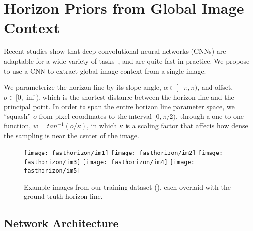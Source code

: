 \section{Horizon Priors from Global Image Context}
\label{sec:deeplearning}

Recent studies show that deep convolutional neural networks (CNNs) are
adaptable for a wide variety of tasks~\cite{yosinski2014transferable},
and are quite fast in practice.  We propose to use a CNN to extract
global image context from a single image.


We parameterize the horizon line by its slope angle, $\alpha \in
[-\pi, \pi)$, and offset, $o \in [0, \inf)$, which is the shortest
distance between the horizon line and the principal point. In order to
span the entire horizon line parameter space, we ``squash'' $o$ from
pixel coordinates to the interval $[0, \pi/2)$, through a one-to-one
function, $w = tan^{-1}(o / \kappa)$, in which $\kappa$ is a
scaling factor that affects how dense the sampling is near the center
of the image.




\begin{figure*}
  \hfill
  \texttt{[image: fasthorizon/im1]}
  \hfill
  \texttt{[image: fasthorizon/im2]}
  \hfill
  \texttt{[image: fasthorizon/im3]}
  \hfill
  \texttt{[image: fasthorizon/im4]}
  \hfill
  \texttt{[image: fasthorizon/im5]}
  \hfill
  \caption{Example images from our training dataset
    (), each overlaid with the ground-truth horizon line.
  }
  \label{fig:dataset}
\end{figure*}

\subsection{Network Architecture}

